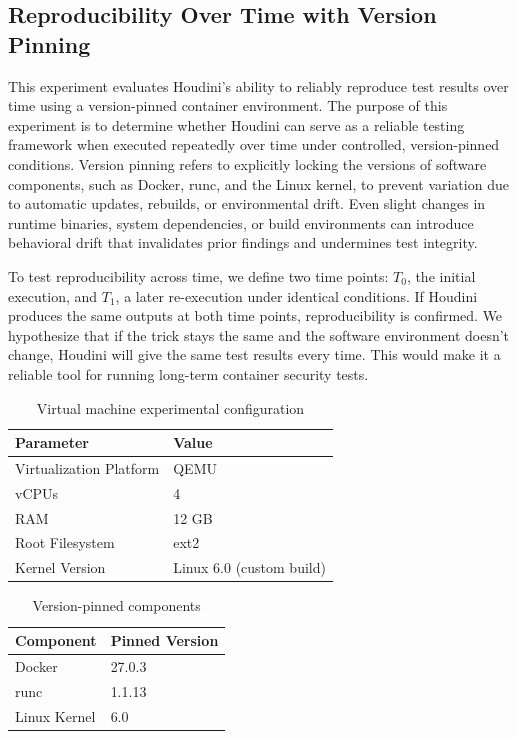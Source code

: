 \documentclass[12pt]{report}
\begin{document}
\begin{doublespace}
\section{Reproducibility Over Time with Version Pinning}

This experiment evaluates Houdini’s ability to reliably reproduce test results over time using a version-pinned container environment. The purpose of this experiment is to determine whether Houdini can serve as a reliable testing framework when executed repeatedly over time under controlled, version-pinned conditions. Version pinning refers to explicitly locking the versions of software components, such as Docker, runc, and the Linux kernel, to prevent variation due to automatic updates, rebuilds, or environmental drift. Even slight changes in runtime binaries, system dependencies, or build environments can introduce behavioral drift that invalidates prior findings and undermines test integrity.

To test reproducibility across time, we define two time points: \( T_0 \), the initial execution, and \( T_1 \), a later re-execution under identical conditions. If Houdini produces the same outputs at both time points, reproducibility is confirmed. We hypothesize that if the trick stays the same and the software environment doesn't change, Houdini will give the same test results every time. This would make it a reliable tool for running long-term container security tests. 

\begin{table}[H]
\centering
\caption{Virtual machine experimental configuration}
\begin{tabular}{|l|l|}
\hline
\textbf{Parameter} & \textbf{Value} \\
\hline
Virtualization Platform & QEMU \\
vCPUs & 4 \\
RAM & 12 GB \\
Root Filesystem & ext2 \\
Kernel Version & Linux 6.0 (custom build) \\
\hline
\end{tabular}
\end{table}

\begin{table}[H]
\centering
\caption{Version-pinned components}
\begin{tabular}{|l|l|}
\hline
\textbf{Component} & \textbf{Pinned Version} \\
\hline
Docker & 27.0.3 \\
runc & 1.1.13 \\
Linux Kernel & 6.0 \\
\hline
\end{tabular}
\end{table}


\end{doublespace}
\end{document}
